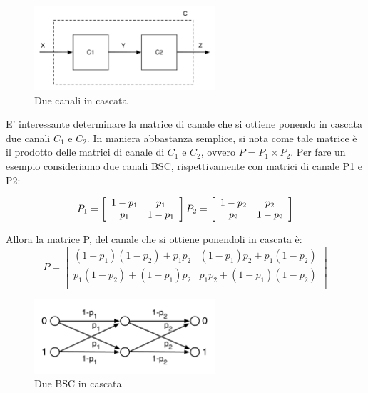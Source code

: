 \begin{figure}[htbp]
\begin{center}
	\includegraphics[width=0.6\textwidth]{img/cascata.pdf}
\caption{Due canali in cascata}
\label{fig:cascata}
\end{center}
\end{figure}

E' interessante determinare la matrice di canale che si ottiene ponendo in cascata due canali $C_1$ e $C_2$. In maniera abbastanza semplice, si nota come tale matrice è il prodotto delle matrici di canale di $C_1$ e $C_2$, ovvero $P=P_1 \times P_2$. Per fare un esempio consideriamo due canali BSC, rispettivamente con matrici di canale P1 e P2:

\[ P_1 = \left[
  \begin{array}{cc}
    1-p_1 & p_1 \\
    p_1 & 1-p_1 \\
  \end{array} \right]
  \\
  P_2 = \left[
  \begin{array}{cc}
    1-p_2 & p_2 \\
    p_2 & 1-p_2 \\
  \end{array} \right]
\]

Allora la matrice P, del canale che si ottiene ponendoli in cascata è:
\[
 P = \left[
  \begin{array}{cc}
    (1-p_1)(1-p_2) + p_1 p_2 & (1-p_1)p_2 + p_1(1-p_2) \\
    p_1 (1-p_2)+(1-p_1)p_2 & p_1 p_2 +(1-p_1)(1-p_2)\\
  \end{array} \right]
\]

\begin{figure}[htbp]
\begin{center}
	\includegraphics[width=0.6\textwidth]{img/cascata2.pdf}
\caption{Due BSC in cascata}
\label{fig:cascata2}
\end{center}
\end{figure}

